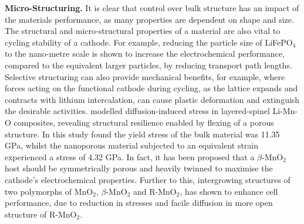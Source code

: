 \documentclass[../main.tex]{subfiles}
\begin{document}
\textbf{Micro-Structuring.} It is clear that control over bulk structure has an impact of the materials performance, as many properties are dependent on shape and size. \cite{bruce2008nanomaterials} The structural and micro-structural properties of a material are also vital to cycling stability of a cathode. For example, reducing the particle size of LiFePO$_4$ to the nano-metre scale is shown to increase the electrochemical performance, compared to the equivalent larger particles, by reducing transport path lengths. \cite{franger2006chemistry, ellis2007synthesis,malik2010particle} Selective structuring can also provide mechanical benefits, for example, where forces acting on the functional cathode during cycling, as the lattice expands and contracts with lithium intercalation, can cause plastic deformation and extinguish the desirable activities. \citeauthor{sayle2018stress} modelled diffusion-induced stress in layered-spinel Li-Mn-O composites, revealing structural resilience enabled by flexing of a porous structure. \cite{sayle2018stress} In this study \citeauthor{sayle2018stress} found the yield stress of the bulk material was 11.35 GPa, whilst the nanoporous material subjected to an equivalent strain experienced a stress of 4.32 GPa. In fact, it has been proposed that a $\beta$-MnO$_2$ host should be symmetrically porous and heavily twinned to maximise the cathode's electrochemical properties. \cite{sayle2009predicting} Further to this, intergrowing structures of two polymorphs of MnO$_2$, $\beta$-MnO$_2$ and R-MnO$_2$,\cite{Gupta2018} has shown to enhance cell performance,\cite{GUPTA2020227619} due to reduction in stresses and facile diffusion in more open structure of R-MnO$_2$.

\end{document}
